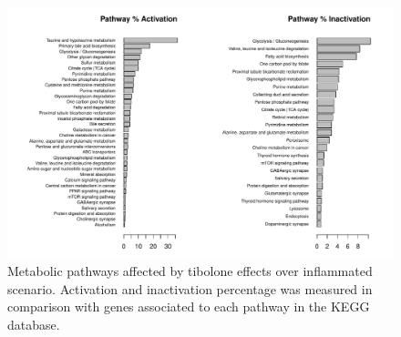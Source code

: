 \begin{figure}[h]
\begin{center}
\includegraphics[width=\textwidth]{neuroprotective/Inflammated2Tibolone}
\end{center}
\caption{Metabolic pathways affected by tibolone effects over inflammated scenario. Activation and inactivation percentage was measured in comparison with genes associated to each pathway in the KEGG database.
}
\label{I2T}
\end{figure}

